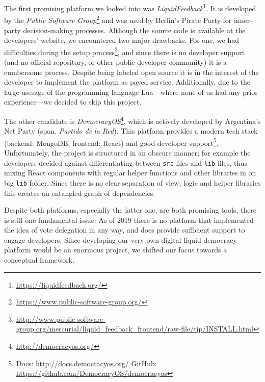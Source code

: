 The first promising platform we looked into was \textit{LiquidFeedback}\footnote{\url{https://liquidfeedback.org/}}. It is developed by the \textit{Public Software Group}\footnote{\url{https://www.public-software-group.org/}} and was used by Berlin’s Pirate Party for inner-party decision-making processes. Although the source code is available at the developers’ website, we encountered two major drawbacks. For one, we had difficulties during the setup process\footnote{\url{http://www.public-software-group.org/mercurial/liquid_feedback_frontend/raw-file/tip/INSTALL.html}}, and since there is no developer support (and no official repository, or other public developer community) it is a cumbersome process. Despite being labeled open source it is in the interest of the developer to implement the platform as payed service. Additionally, due to the large usesage of the programming language Lua---where none of us had any prior experience---we decided to skip this project.

The other candidate is \textit{DemocracyOS}\footnote{\url{http://democracyos.org/}}, which is actively developed by Argentina’s Net Party (span. \textit{Partido de la Red}). This platform provides a modern tech stack (backend: MongoDB, frontend: React) and good developer support\footnote{Docs: \url{http://docs.democracyos.org/} GitHub: \url{https://github.com/DemocracyOS/democracyos}}. Unfortunately, the project is structured in an obscure manner; for example the developers decided against differentiating between \texttt{src} files and \texttt{lib} files, thus mixing React components with regular helper functions and other libraries in on big \texttt{lib} folder. Since there is no clear separation of view, logic and helper libraries this creates an entangled graph of dependencies.

Despite both platforms, especially the latter one, are both promising tools, there is still one fundamental issue: As of 2019 there is no  platform that implemented the idea of vote delegation in any way, and does provide sufficient support to engage developers. Since developing our very own digital liquid democracy platform would be an enormous project, we shifted our focus towards a conceptual framework.




